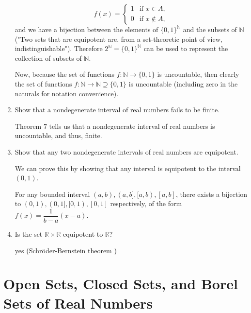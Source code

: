 \begin{enumerate}
	\[
		f(x) =
	\begin{cases}
		1 & \text{if } x \in A,\\
		0 & \text{if } x \notin A,
	\end{cases}	
	\]
	and we have a bijection between the elements of $\{0,1\}^{\mathbb{N}}$ and the subsets of $\mathbb{N}$ ("Two sets that are equipotent are, from a set-theoretic point of view, indistinguishable").
	Therefore $2^{\mathbb{N}}= \{0,1\}^{\mathbb{N}}$ can be used to represent the collection of subsets of $\mathbb{N}$.\par
	Now, because the set of functions $f:\mathbb{N} \to \{0,1\}$ is uncountable, then clearly the set of functions $f:\mathbb{N} \to \mathbb{N} \supseteq \{0,1\}$ is uncountable (including zero in the naturals for notation convenience).
	\item Show that a nondegenerate interval of real numbers fails to be finite.\par
	Theorem 7 tells us that a nondegenerate interval of real numbers is uncountable, and thus, finite.	
	\item Show that any two nondegenerate intervals of real numbers are equipotent.\par
	We can prove this by showing that any interval is equipotent to the interval $(0,1)$.\par
	For any bounded interval $(a,b),(a,b],[a,b),[a,b]$, there exists a bijection to $(0,1),(0,1],[0,1),[0,1]$ respectively,
	of the form $f(x) = \dfrac{1}{b-a}(x-a)$.\par
	\item Is the set $\mathbb{R} \times \mathbb{R}$ equipotent to $\mathbb{R}$?\par
	yes (Schr\"oder-Bernstein theorem	)
\end{enumerate}

\section{Open Sets, Closed Sets, and Borel Sets of Real Numbers}

